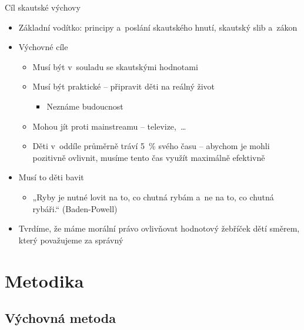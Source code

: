 \documentclass[compress,xelatex,xcolor=dvipsnames,print]{beamer}
\begin{document}
\begin{frame}{Cíl skautské výchovy}
\begin{itemize}
 \item Základní vodítko: principy a~poslání skautského hnutí, skautský slib a~zákon
 \item Výchovné cíle
 \begin{itemize}
  \item Musí být v~souladu se skautskými hodnotami
  \item Musí být praktické -- připravit děti na reálný život
  \begin{itemize}
   \item Neznáme budoucnost
  \end{itemize}
  \item Mohou jít proti mainstreamu -- televize,~\ldots
 \item Děti v~oddíle průměrně tráví 5~\% svého času -- abychom je mohli pozitivně ovlivnit, musíme tento čas využít maximálně efektivně
 \end{itemize}
 \item Musí to děti bavit
 \begin{itemize}
 \item „Ryby je nutné lovit na to, co chutná rybám a~ne na to, co chutná rybáři.“ (Baden-Powell)
 \end{itemize}
 \item Tvrdíme, že máme morální právo ovlivňovat hodnotový žebříček dětí směrem, který považujeme za správný
\end{itemize}
\end{frame}

\section{Metodika}

\subsection{Výchovná metoda}
\end{document}

